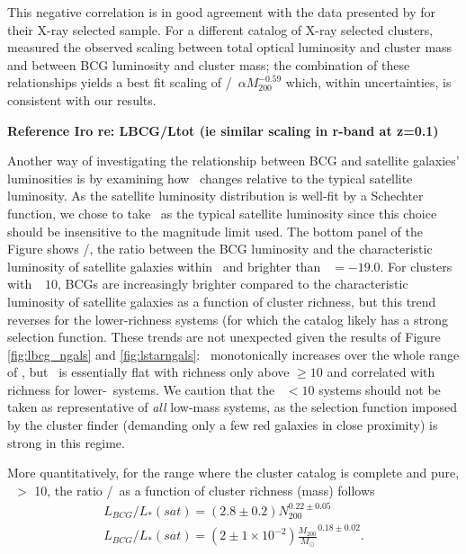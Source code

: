 \documentclass{emulateapj}
\begin{document}
This negative correlation is in good agreement with the data presented
by \citet{LinMohr04} for their X-ray selected sample. For a different
catalog of X-ray selected clusters, \citet{PopessoMLHOD} measured the
observed scaling between total optical luminosity and cluster mass and
between BCG luminosity and cluster mass; the combination of these
relationships yields a best fit scaling of \Lbcg/\deltalvir\ $\alpha
M_{200} ^{-0.59}$ which, within uncertainties, is consistent with our
results.

{\bf Reference Iro re: LBCG/Ltot (ie similar scaling in r-band at z=0.1)}

Another way of investigating the relationship between BCG and
satellite galaxies' luminosities is by examining how \Lbcg\ changes
relative to the typical satellite luminosity. As the satellite
luminosity distribution is well-fit by a Schechter function, we chose
to take \Lstarsat\ as the typical satellite luminosity since this
choice should be insensitive to the magnitude limit used. The bottom
panel of the Figure shows \Lbcg/\Lstarsat, the ratio between the BCG
luminosity and the characteristic luminosity of satellite galaxies
within \rtwo\ and brighter than \Mi\ $= -19.0$. For clusters with
\Ntwo\ $\> 10$, BCGs are increasingly brighter compared to the
characteristic luminosity of satellite galaxies as a function of
cluster richness, but this trend reverses for the lower-richness
systems (for which the catalog likely has a strong selection function. These trends are not unexpected given the results
of Figure \ref{fig:lbcg_ngals} and \ref{fig:lstarngals}: \Lbcg\
monotonically increases over the whole range of \Ntwo, but \Lstarsat\
is essentially flat with richness only above \Ntwo $\ge 10$ and
correlated with richness for lower-\Ntwo\ systems. We caution that the
\Ntwo\ $< 10$ systems should not be taken as representative of {\it
  all} low-mass systems, as the selection function imposed by the
cluster finder (demanding only a few red galaxies in close proximity)
is strong in this regime.


More quantitatively, for the range where the cluster catalog is complete and pure, \Ntwo\ $>$ 10, the ratio \Lbcg/\Lstarsat\ as a function of cluster richness (mass) follows
\begin{eqnarray}
L_{BCG}/L_*(sat) = (2.8 \pm 0.2) N_{200}^{0.22 \pm 0.05}\\
L_{BCG}/L_*(sat) = (2 \pm 1 \times 10^{-2}) \frac{M_{200}}{M_{\odot}}^{0.18 \pm 0.02}.
\end{eqnarray}
\end{document}
